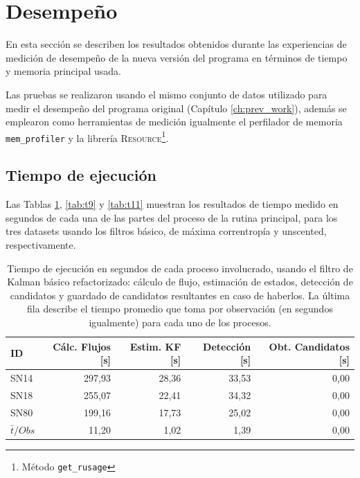 \section{Desempe\~no}
En esta secci\'on se describen los resultados obtenidos durante las experiencias de medici\'on de desempe\~no de la nueva versi\'on del programa en t\'erminos de tiempo y memoria principal usada. 
\bigskip

Las pruebas se realizaron usando el mismo conjunto de datos utilizado para medir el desempe\~no del programa original 
(Cap\'itulo \ref{ch:prev_work}), adem\'as se emplearon como herramientas de medici\'on igualmente el perfilador de memoria \texttt{mem\_profiler} y la librer\'ia \textsc{Resource}\footnote{M\'etodo \texttt{get\_rusage}}.

\subsection{Tiempo de ejecuci\'on}
Las Tablas \ref{tab:t7}, \ref{tab:t9} y \ref{tab:t11} muestran los resultados de tiempo medido en segundos de cada una de las partes del proceso de la rutina principal, para los tres datasets usando los filtros b\'asico, de m\'axima correntrop\'ia y unscented, respectivamente. 

\begin{table}[h!]
\centering
\caption{Tiempo de ejecuci\'on en segundos de cada proceso involucrado, usando el filtro de Kalman b\'asico refactorizado: c\'alculo de flujo, estimaci\'on de estados, detecci\'on de candidatos y guardado de candidatos resultantes en caso de haberlos. La \'ultima fila describe el tiempo promedio que toma por observaci\'on (en segundos igualmente) para cada uno de los procesos. }
\begin{tabular}{|l|r|r|r|r|}
\hline
\textbf{ID} & \textbf{C\'alc. Flujos [s]} & \textbf{Estim. KF [s]} &  \textbf{Detecci\'on [s]}  & \textbf{Obt. Candidatos [s]}\\ \hline \hline
SN14        & 297,93            & 28,36        &  33,53 & 0,00 \\ \hline
SN18            & 255,07             & 22,41         & 34,32  & 0,00\\ \hline
SN80            & 199,16             & 17,73         &   25,02 & 0,00 \\ \hline \hline
$\bar{t}/Obs$ & 11,20 &  1,02 & 1,39 & 0,00\\\hline 
\end{tabular}
\label{tab:t7}
\end{table}

